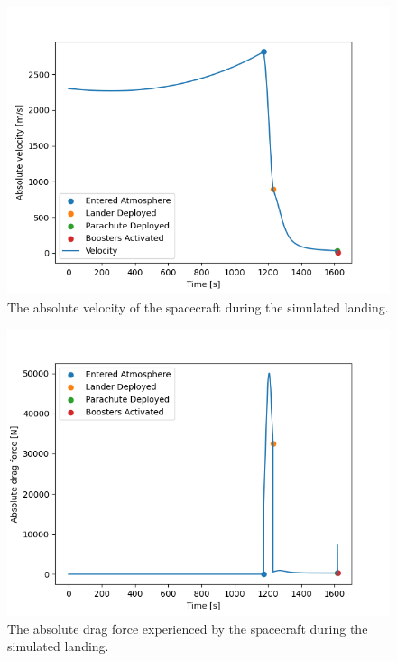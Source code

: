 \documentclass[reprint,english,notitlepage]{revtex4-2}
\begin{document}
\begin{figure}[h]
    \centering
    \includegraphics[scale=0.15]{Figures/sim_landing_velocity}
    \caption{The absolute velocity of the spacecraft during the simulated landing.}\label{fig:sim_landing_velocity}
\end{figure}

\begin{figure}[h]
    \centering
    \includegraphics[scale=0.15]{Figures/sim_landing_f_drag}
    \caption{The absolute drag force experienced by the spacecraft during the simulated landing.}\label{fig:sim_landing_f_drag}
\end{figure}
\end{document}
